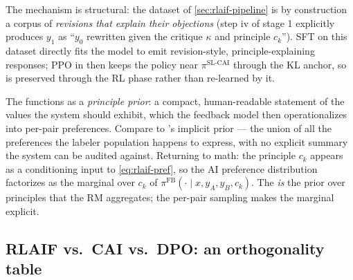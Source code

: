 The mechanism is structural: the  dataset of
\cref{sec:rlaif-pipeline} is by construction a corpus of
\emph{revisions that explain their objections} (step iv of stage 1
explicitly produces $y_1$ as ``$y_0$ rewritten given the critique
$\kappa$ and principle $c_k$''). SFT on this dataset directly fits the
model to emit revision-style, principle-explaining responses; PPO in
 then keeps the policy near $\pi^{\mathrm{SL\text{-}CAI}}$
through the KL anchor, so  is preserved through the RL
phase rather than re-learned by it.

\begin{intuition}
The  functions as a \emph{principle prior}: a compact,
human-readable statement of the values the system should exhibit,
which the feedback model then operationalizes into per-pair
preferences. Compare to 's implicit prior — the union of all the
preferences the labeler population happens to express, with no
explicit summary the system can be audited against. Returning to math:
the principle $c_k$ appears as a conditioning input to
\cref{eq:rlaif-pref}, so the AI preference distribution factorizes as
the marginal over $c_k$ of $\pi^{\mathrm{FB}}(\cdot \mid x, y_A, y_B,
c_k)$. The  \emph{is} the prior over principles that the
RM aggregates; the per-pair sampling makes the marginal explicit.
\end{intuition}

\subsection{RLAIF vs.\ CAI vs.\ DPO: an orthogonality table}
\label{sec:rlaif-orthogonal}

